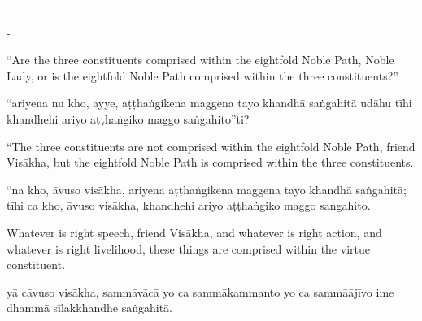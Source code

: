 \begin{samepage}
\begin{leftcolumn*}
-
\end{leftcolumn*}

\begin{rightcolumn}
-
\end{rightcolumn}
\end{samepage}

\begin{samepage}
\begin{leftcolumn*}
“Are the three constituents comprised within the eightfold Noble Path, Noble Lady, or is the eightfold Noble Path comprised within the three constituents?”
\end{leftcolumn*}

\begin{rightcolumn}
“ariyena nu kho, ayye, aṭṭhaṅgikena maggena tayo khandhā saṅgahitā udāhu tīhi khandhehi ariyo aṭṭhaṅgiko maggo saṅgahito”ti?
\end{rightcolumn}
\end{samepage}

\begin{samepage}
\begin{leftcolumn*}
“The three constituents are not comprised within the eightfold Noble Path, friend Visākha, but the eightfold Noble Path is comprised within the three constituents.
\end{leftcolumn*}

\begin{rightcolumn}
“na kho, āvuso visākha, ariyena aṭṭhaṅgikena maggena tayo khandhā saṅgahitā; tīhi ca kho, āvuso visākha, khandhehi ariyo aṭṭhaṅgiko maggo saṅgahito.
\end{rightcolumn}
\end{samepage}

\begin{samepage}
\begin{leftcolumn*}
Whatever is right speech, friend Visākha, and whatever is right action, and whatever is right livelihood, these things are comprised within the virtue constituent.
\end{leftcolumn*}

\begin{rightcolumn}
yā cāvuso visākha, sammāvācā yo ca sammākammanto yo ca sammāājīvo ime dhammā sīlakkhandhe saṅgahitā.
\end{rightcolumn}
\end{samepage}

